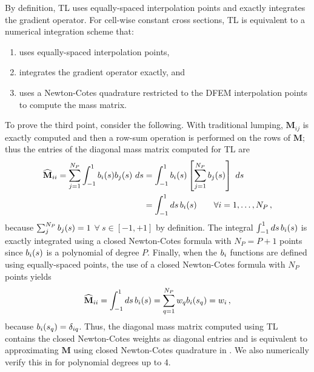 
By definition, TL uses equally-spaced interpolation points and exactly integrates the gradient operator. 
For cell-wise constant cross sections, TL is equivalent to a numerical integration scheme that:
\begin{enumerate}
\item uses equally-spaced interpolation points, 
\item integrates the gradient operator exactly, and  
\item uses a Newton-Cotes quadrature restricted to the DFEM interpolation points to compute the mass matrix.
\end{enumerate}
To prove the third point, consider the following.
With traditional lumping, $\mathbf{M}_{ij}$ is exactly computed and then a row-sum operation is performed on the rows of $\mathbf{ M}$; thus the entries of the diagonal mass matrix computed for TL are
\begin{align}
\widehat{\mathbf M}_{ii} = \sum_{j=1}^{N_P}{ \int_{-1}^1 b_{i} (s)b_{j} (s) ~ds}
&=  \int_{-1}^1{ b_{i} (s) \left[  \sum_{j=1}^{N_P} b_{j} (s)\right]~ds  } 
 \notag \\ 
&=\int_{-1}^1{ds\, b_{i} (s) }\qquad \forall i=1,\ldots,N_P \, ,
\end{align}
because $\sum_j^{N_P}{ b_{j} (s)} =1$ $\forall ~s\in [-1,+1]$ by definition.  
The integral $\int_{-1}^1{ ds\, b_{i} (s)}$ is exactly integrated using a closed Newton-Cotes formula with $N_P=P+1$ points since $b_{i} (s)$ is a polynomial of degree $P$. 
Finally, when the $b_{i} $ functions are defined using
equally-spaced points,  the use of a closed Newton-Cotes formula with $N_P$ points yields
\begin{equation}
\widehat{\mathbf M}_{ii} = \int_{-1}^1{ ds\, b_{i} (s)}  = \sum_{q=1}^{N_P} {w_q b_{i} (s_q)} = w_i \, ,
\end{equation}
because $b_{i} (s_q) =\delta_{iq}$. 
Thus, the diagonal mass matrix computed using TL contains the closed Newton-Cotes weights as diagonal entries and is equivalent to approximating $\mathbf{M}$ using closed Newton-Cotes quadrature in . 
We also numerically verify this in  for polynomial degrees up to 4.
